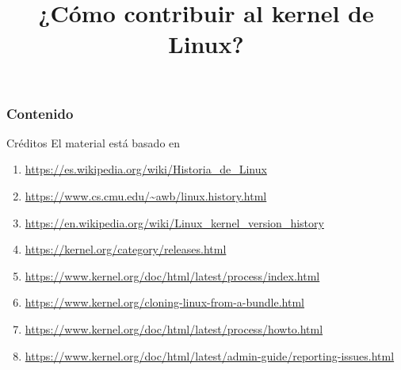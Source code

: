 \documentclass[aspectratio=169]{beamer}
\title{¿Cómo contribuir al kernel de Linux?}
\newcommand{\nologo}{\setbeamertemplate{logo}{}} %
\begin{document}
{
\nologo
\begin{frame}
    \titlepage
\end{frame}
}

\begin{frame}
    \frametitle{Contenido}
    \tableofcontents
\end{frame}



\begin{frame}[c]{Créditos}
  \label{creditos}
  El material está basado en
  \begin{enumerate}
    \item
      \href{https://es.wikipedia.org/wiki/Historia_de_Linux}
      {https://es.wikipedia.org/wiki/Historia\_de\_Linux}
    \item
      \href{https://www.cs.cmu.edu/~awb/linux.history.html}
      {https://www.cs.cmu.edu/\~{}awb/linux.history.html}
    \item
      \href{https://en.wikipedia.org/wiki/Linux_kernel_version_history}
      {https://en.wikipedia.org/wiki/Linux\_kernel\_version\_history}
    \item
      \href{https://kernel.org/category/releases.html}
      {https://kernel.org/category/releases.html}
    \item
      \href{https://www.kernel.org/doc/html/latest/process/index.html}
      {https://www.kernel.org/doc/html/latest/process/index.html}
    \item
      \href{https://www.kernel.org/cloning-linux-from-a-bundle.html}
      {https://www.kernel.org/cloning-linux-from-a-bundle.html}
    \item
      \href{https://www.kernel.org/doc/html/latest/process/howto.html}
      {https://www.kernel.org/doc/html/latest/process/howto.html}
    \item
      \href{https://www.kernel.org/doc/html/latest/admin-guide/reporting-issues.html}
      {https://www.kernel.org/doc/html/latest/admin-guide/reporting-issues.html}
  \end{enumerate}
\end{frame}
\end{document}

